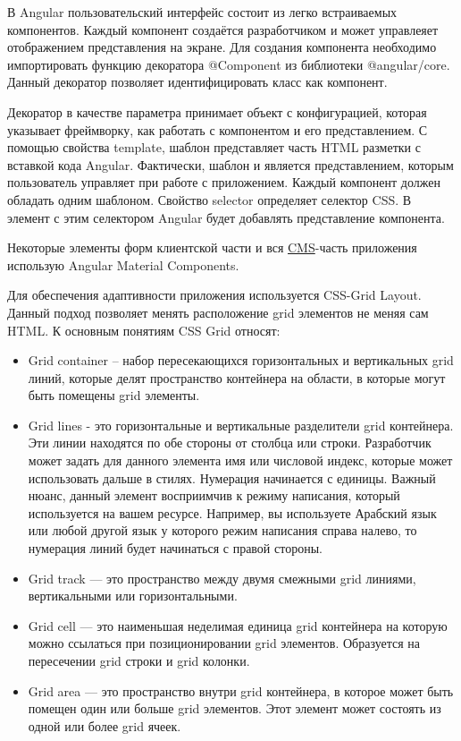 В Angular пользовательский интерфейс состоит из легко встраиваемых компонентов.
Каждый компонент создаётся разработчиком и может управлеяет отображением представления на экране.
Для создания компонента необходимо импортировать функцию декоратора @Component из библиотеки @angular/core.
Данный декоратор позволяет идентифицировать класс как компонент.

Декоратор в качестве параметра принимает объект с конфигурацией, которая указывает фреймворку, как работать с компонентом и его представлением.
С помощью свойства template, шаблон представляет часть HTML разметки с вставкой кода Angular.
Фактически, шаблон и является представлением, которым пользователь управляет при работе с приложением.
Каждый компонент должен обладать одним шаблоном.
Свойство selector определяет селектор CSS. В элемент с этим селектором Angular будет добавлять представление компонента.

Некоторые элементы форм клиентской части и вся \hyperlink{gloss:cms}{CMS}-часть приложения использую Angular Material Components.

Для обеспечения адаптивности приложения используется CSS-Grid Layout.
Данный подход позволяет менять расположение grid элементов не меняя сам HTML. К основным понятиям CSS Grid относят:
\begin{itemize}
    \item Grid container – набор пересекающихся горизонтальных и вертикальных grid линий, которые делят пространство контейнера на области, в которые могут быть помещены grid элементы.
    \item Grid lines - это горизонтальные и вертикальные разделители grid контейнера.
    Эти линии находятся по обе стороны от столбца или строки.
    Разработчик может задать для данного элемента имя или числовой индекс, которые может использовать дальше в стилях.
    Нумерация начинается с единицы.
    Важный нюанс, данный элемент восприимчив к режиму написания, который используется на вашем ресурсе.
    Например, вы используете Арабский язык или любой другой язык у которого режим написания справа налево, то нумерация линий будет начинаться с правой стороны.
    \item Grid track — это пространство между двумя смежными grid линиями, вертикальными или горизонтальными.
    \item Grid cell — это наименьшая неделимая единица grid контейнера на которую можно ссылаться при позиционировании grid элементов.
    Образуется на пересечении grid строки и grid колонки.
    \item Grid area — это пространство внутри grid контейнера, в которое может быть помещен один или больше grid элементов.
    Этот элемент может состоять из одной или более grid ячеек.
\end{itemize}

